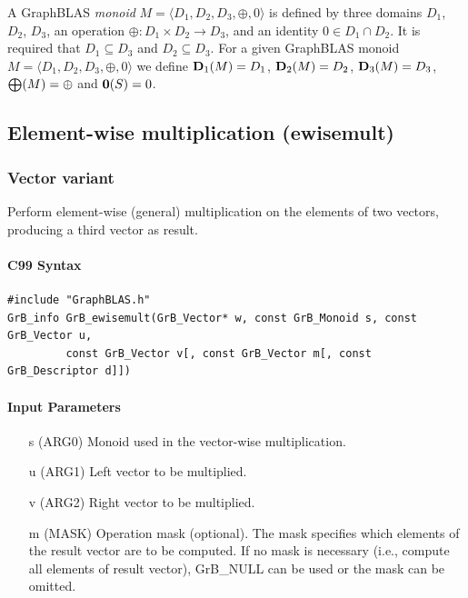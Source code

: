 \documentclass[11pt]{extarticle}
\begin{document}
{A GraphBLAS \emph{monoid} $M = \langle D_1,D_2,D_3,\oplus,0 \rangle$ is
defined by three domains $D_1$, $D_2$, $D_3$, an operation $\oplus:
D_1 \times D_2 \rightarrow D_3$, and an identity $0 \in D_1 \cap D_2$.
It is required that $D_1 \subseteq D_3$ and $D_2 \subseteq D_3$. For a given GraphBLAS monoid $M=\langle
D_1, D_2, D_3,\oplus,0 \rangle$ we define $\bold{D}_1(M) =
D_1$, $\bold{D}_2(M) = D_2$, $\bold{D}_3(M) = D_3$, $\bold{\bigoplus}(M)
= \oplus$ and $\bold{0}(S) = 0$.

\subsection{Element-wise multiplication ({\sf ewisemult})}

\subsubsection{Vector variant}

Perform element-wise (general) multiplication on the elements of two vectors,
producing a third vector as result.

\paragraph{C99 Syntax}

\begin{verbatim}
#include "GraphBLAS.h"
GrB_info GrB_ewisemult(GrB_Vector* w, const GrB_Monoid s, const GrB_Vector u,
         const GrB_Vector v[, const GrB_Vector m[, const GrB_Descriptor d]])
\end{verbatim}

\paragraph{Input Parameters}

\begin{itemize}
	\item[{\sf s}] ({\sf ARG0}) Monoid used in the vector-wise multiplication.

	\item[{\sf u}] ({\sf ARG1}) Left vector to be multiplied.

	\item[{\sf v}] ({\sf ARG2}) Right vector to be multiplied.

	\item[{\sf m}] ({\sf MASK}) Operation mask (optional). The mask
	specifies which elements of the result vector are to be computed.
	If no mask is necessary (i.e., compute all elements of result
	vector), {\sf GrB\_NULL} can be used or the mask can be omitted.


\end{itemize}}
\end{document}
